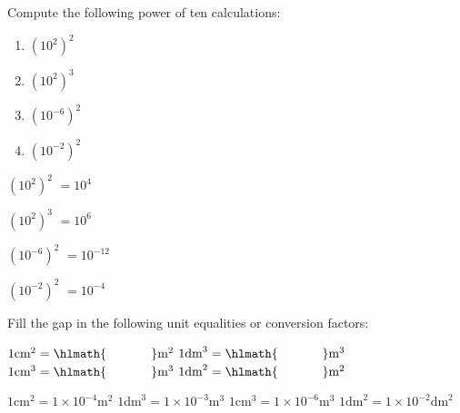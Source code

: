 \documentclass[main.tex]{subfiles}
\begin{document}
\begin{multicols*}{2}
\begin{question}[ID=\the\value{numA}]
Compute the following power of ten calculations:
 \begin{multicols}{2}
 \noindent
  \begin{enumerate} [topsep=0pt, partopsep=1pt, label=(\alph*), leftmargin=1cm]	
\item $(10^2)^2$ \iffalse $=10^4$ \fi
\item $(10^2)^3$ \iffalse $=10^6$ \fi
\item $(10^{-6})^2$ \iffalse $=10^{-12}$ \fi
\item $(10^{-2})^2$ \iffalse $=10^{-4}$ \fi
\end{enumerate}
\end{multicols}
\end{question}
\begin{solution}
\begin{inparaenum}[(a)]
\item $(10^2)^2$   $=10^4$  
\item $(10^2)^3$   $=10^6$  
\item $(10^{-6})^2$   $=10^{-12}$ 
\item $(10^{-2})^2$  $=10^{-4}$  
 \end{inparaenum}
\hspace{0.1cm}\end{solution}%


\begin{question}[ID=\the\value{numA}]
Fill the gap in the following unit equalities or conversion factors:
\begin{multicols}{2}  
\noindent\RaggedRight
 $1\text{cm}^2=\hlmath{\hspace{35pt }}\text{m}^2$
 $1\text{dm}^3=\hlmath{\hspace{35pt }}\text{m}^3$
 $1\text{cm}^3=\hlmath{\hspace{35pt }}\text{m}^3$
 $1\text{dm}^2=\hlmath{\hspace{35pt }}\text{m}^2$
 \end{multicols}
\end{question}
\begin{solution}
$1\text{cm}^2=  1\times 10^{-4}    \text{m}^2$
 $1\text{dm}^3=  1\times 10^{-3}     \text{m}^3$
 $1\text{cm}^3=   1\times 10^{-6}   \text{m}^3$
 $1\text{dm}^2=  1\times 10^{-2} \text{dm}^2$
\hspace{0.1cm}\end{solution}%



\end{multicols*}
\end{document}
